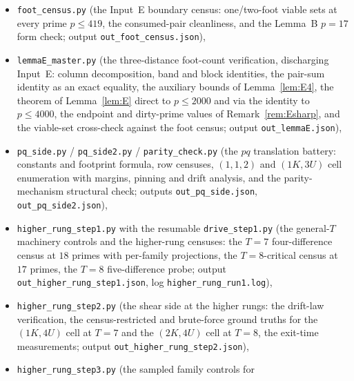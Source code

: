 \documentclass[11pt,a4paper]{article}
\numberwithin{equation}{section}
\theoremstyle{plain}
\theoremstyle{definition}
\theoremstyle{remark}
\begin{document}
\begin{itemize}[leftmargin=2.2em,itemsep=1pt,topsep=2pt]
        verification: identity checks on all exceptions and census
        coverings, sharp-form sampling, kernel checks, the four-family
        census with per-multiset counts, defect statistics, and the
        witness/solution count reconciliation; output
        \texttt{out\_groupring\_bridge.json}, log
        \texttt{groupring\_run.log}),
  \item \texttt{foot\_census.py} (the Input~E boundary census: one/two-foot
        viable sets at every prime $p\le419$, the consumed-pair
        cleanliness, and the Lemma~B $p=17$ form check; output
        \texttt{out\_foot\_census.json}),
  \item \texttt{lemmaE\_master.py} (the three-distance foot-count
        verification, discharging Input~E: column decomposition, band and
        block identities, the pair-sum identity as an exact equality, the
        auxiliary bounds of Lemma~\ref{lem:E4}, the theorem of
        Lemma~\ref{lem:E} direct to $p\le2000$ and via the identity to
        $p\le4000$, the endpoint and dirty-prime values of
        Remark~\ref{rem:Esharp}, and the viable-set cross-check against
        the foot census; output \texttt{out\_lemmaE.json}),
  \item \texttt{pq\_side.py} / \texttt{pq\_side2.py} / \texttt{parity\_check.py}
        (the $pq$ translation battery: constants and footprint formula,
        row censuses, $(1,1,2)$ and $(1K,3U)$ cell enumeration with
        margins, pinning and drift analysis, and the parity-mechanism
        structural check; outputs \texttt{out\_pq\_side.json},
        \texttt{out\_pq\_side2.json}),
  \item \texttt{higher\_rung\_step1.py} with the resumable
        \texttt{drive\_step1.py} (the general-$T$ machinery controls and
        the higher-rung censuses: the $T=7$ four-difference census at
        $18$ primes with per-family projections, the $T=8$-critical
        census at $17$ primes, the $T=8$ five-difference probe; output
        \texttt{out\_higher\_rung\_step1.json}, log
        \texttt{higher\_rung\_run1.log}),
  \item \texttt{higher\_rung\_step2.py} (the shear side at the higher
        rungs: the drift-law verification, the census-restricted and
        brute-force ground truths for the $(1K,4U)$ cell at $T=7$ and the
        $(2K,4U)$ cell at $T=8$, the exit-time measurements; output
        \texttt{out\_higher\_rung\_step2.json}),
  \item \texttt{higher\_rung\_step3.py} (the sampled family controls for

\end{itemize}
\end{document}
